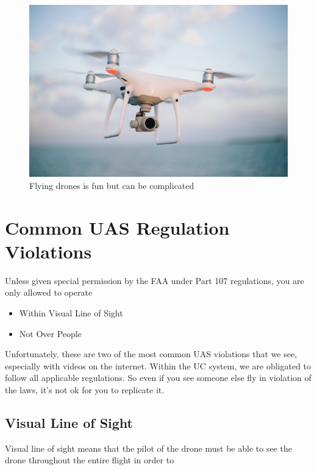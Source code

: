\documentclass[
  12pt,
]{book}
\providecommand{\tightlist}{%
  \setlength{\itemsep}{0pt}\setlength{\parskip}{0pt}}
\begin{document}
\begin{figure}

{\centering \includegraphics[width=0.75\linewidth]{images/phantom_1} 

}

\caption{Flying drones is fun but can be complicated}\label{fig:drone2}
\end{figure}

\hypertarget{common-UAS-violations}{%
\section{Common UAS Regulation Violations}\label{common-UAS-violations}}

Unless given special permission by the FAA under Part 107 regulations, you are only allowed to operate

\begin{itemize}
\tightlist
\item
  Within Visual Line of Sight
\item
  Not Over People
\end{itemize}

Unfortunately, these are two of the most common UAS violations that we see, especially with videos on the internet. Within the UC system, we are obligated to follow all applicable regulations. So even if you see someone else fly in violation of the laws, it's not ok for you to replicate it.

\hypertarget{visual-line-of-sight}{%
\subsection{Visual Line of Sight}\label{visual-line-of-sight}}

Visual line of sight means that the pilot of the drone must be able to see the drone throughout the entire flight in order to
\end{document}
